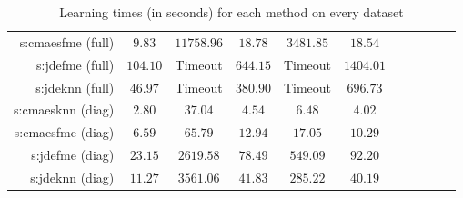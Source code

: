 \begin{table}[ht]
{\begin{tabular}{rcccccccccc}
s:\ac{cmaesfme} (full) & $9.83$ & $11758.96$ & $18.78$ & $3481.85$ & $18.54$ \\
s:\ac{jdefme} (full) & $104.10$ & Timeout  & $644.15$ & Timeout  & $1404.01$ \\
s:\ac{jdeknn} (full) & $46.97$ & Timeout  & $380.90$ & Timeout  & $696.73$ \\
s:\ac{cmaesknn} (diag) & $2.80$ & $37.04$ & $4.54$ & $6.48$ & $4.02$ \\
s:\ac{cmaesfme} (diag) & $6.59$ & $65.79$ & $12.94$ & $17.05$ & $10.29$ \\
s:\ac{jdefme} (diag) & $23.15$ & $2619.58$ & $78.49$ & $549.09$ & $92.20$ \\
s:\ac{jdeknn} (diag) & $11.27$ & $3561.06$ & $41.83$ & $285.22$ & $40.19$ \\


\bottomrule
\end{tabular}
}
\caption{Learning times (in seconds) for each method on every dataset} \label{tab:learning-times}
\end{table}
